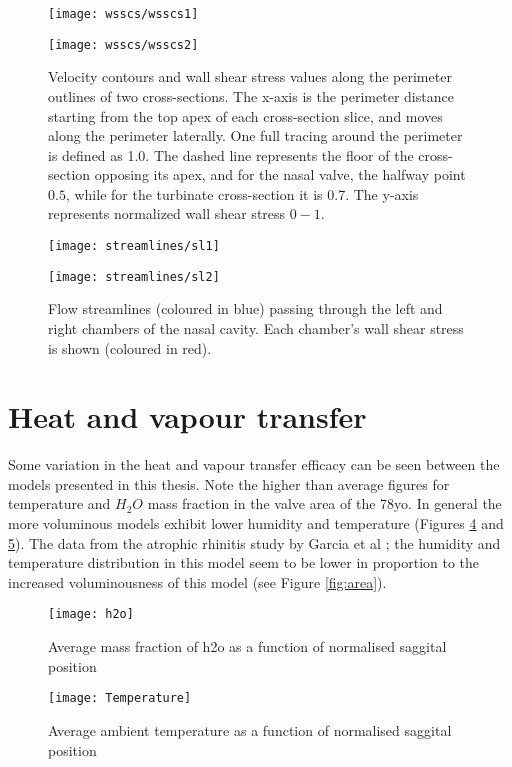 \begin{figure} 
  \texttt{[image: wsscs/wsscs1]}
  \label{fig:wcs}
\end{figure}

\begin{figure} 
  \texttt{[image: wsscs/wsscs2]}
  \caption{Velocity contours and wall shear stress values along the perimeter outlines of two cross-sections. The x-axis is the perimeter distance starting from the top apex of each cross-section slice, and moves along the perimeter laterally. One full tracing around the perimeter is defined as 1.0. The dashed line represents the floor of the cross-section opposing its apex, and for the nasal valve, the halfway point \(0.5\), while for the turbinate cross-section it is 0.7. The y-axis represents normalized wall shear stress \(0 - 1\).}
  \label{fig:wcs}
\end{figure}

\begin{figure} 
  \texttt{[image: streamlines/sl1]}
  \end{figure}

\begin{figure} 
  \texttt{[image: streamlines/sl2]}
  \caption{Flow streamlines (coloured in blue) passing through the left and right chambers of the nasal cavity. Each chamber’s wall shear stress is shown (coloured in red).}
  \label{fig:vsl}
\end{figure}

 
\section{Heat and vapour transfer}

Some variation in the heat and vapour transfer efficacy can be seen between the models presented in this thesis. Note the higher than average figures for temperature and $H_2 O$ mass fraction in the valve area of the 78yo. In general the more voluminous models exhibit lower humidity and temperature (Figures \ref{fig:h2o} and \ref{fig:Temp}). The data from the atrophic rhinitis study by Garcia et al \cite{Garcia2007}; the humidity and temperature distribution in this model seem to be lower in proportion to the increased voluminousness of this model (see Figure \ref{fig:area}).

\begin{figure} 
  \texttt{[image: h2o]}
  \caption{Average mass fraction of h2o as a function of normalised saggital position}
  \label{fig:h2o}
\end{figure}


\begin{figure} 
  \texttt{[image: Temperature]}
  \caption{Average ambient temperature as a function of normalised saggital position}
  \label{fig:Temp}
\end{figure}
